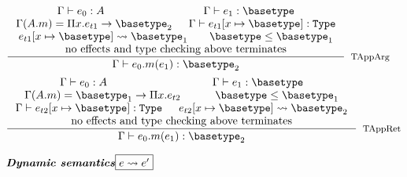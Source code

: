 \documentclass{article}
\def\emphbf#1{\textbf{\emph{#1}}}
\newcommand{\judgementHead}[2]{\ensuremath{\emphbf{#1}\hfill\fbox{#2}}}
\newcommand{\teval}[3]{\ensuremath{#1 \vdash #2:#3}}
\newcommand{\eeval}[2]{\ensuremath{#1 \rightsquigarrow #2}}
\newcommand{\subst}[2]{\ensuremath{[ #1 \mapsto #2 ]}}
\newcommand{\targ}{\texttt{targ}}
\newcommand{\trec}{\texttt{trec}}
\newcommand\trspace{\vspace{0.8em}}
\newcommand{\subtype}[2]{\ensuremath{#1\leq #2}}
\newcommand\expr{\ensuremath{e}\xspace}
\newcommand\type{\tau}
\newcommand\deptype{\ensuremath{\Pi\var.\expr}}
\newcommand\var{\ensuremath{x}\xspace}
\newcommand\eself{\texttt{self}\xspace}
\newcommand\emethcall[3]{\ensuremath{#1.#2(#3)}\xspace}
\newcommand\mthtype[2]{\ensuremath{#1 \rightarrow #2}\xspace}
\begin{document}
\begin{figure}
$$$$
\trspace
$$
\inference{\teval{\Gamma}{\expr_0}{A} &&
\teval{\Gamma}{\expr_1}{\basetype} \\
\Gamma(A.m) = \mthtype{\deptype_{t1}}{\basetype_2} &&
\teval{\Gamma}{\expr_{t1}\subst{\var}{\basetype}}{\texttt{Type}} \\
\eeval{\expr_{t1}\subst{\var}{\basetype}}{\basetype_1} &&
\subtype{\basetype}{\basetype_1} \\
\textnormal{no effects and type checking above terminates}
}
{\teval{\Gamma}{\emethcall{\expr_0}{m}{\expr_1}}{\basetype_2}}[TAppArg]
$$
\trspace
$$
\inference{\teval{\Gamma}{\expr_0}{A} &&
\teval{\Gamma}{\expr_1}{\basetype} \\
\Gamma(A.m) = \mthtype{\basetype_1}{\deptype_{t2}} &&
\subtype{\basetype}{\basetype_1} \\
\teval{\Gamma}{\expr_{t2}\subst{\var}{\basetype}}{\texttt{Type}} &&
\eeval{\expr_{t2}\subst{\var}{\basetype}}{\basetype_2} \\
\textnormal{no effects and type checking above terminates}
}
{\teval{\Gamma}{\emethcall{\expr_0}{m}{\expr_1}}{\basetype_2}}[TAppRet]
$$


\begin{comment}
\inference{\teval{\Gamma}{\expr_0}{\Gamma_1}{A} &&
\teval{\Gamma_1}{\expr_1}{\Gamma_2}{\basetype} \\
\Gamma_1(A.m) = \mthtype{\expr_{t1}}{\type_2} \\
\eeval{\expr_{t1}\subst{\trec}{A}\subst{\targ}{\basetype}\subst{\eself}{A}}{\basetype_1} \\
\teval{\Gamma_2\subst{A.m}{(\mthtype{\basetype_1}{\type_2})}}{\emethcall{\expr_0}{m}{\expr_1}}{\Gamma_3}{\basetype_2} \\
\textnormal{no effects in $e_{t1}$}
}
{\teval{\Gamma}{\emethcall{\expr_0}{m}{\expr_1}}{\Gamma_3}{\basetype_2}}[TAppArg]
$$
\trspace
$$
\inference{\teval{\Gamma}{\expr_0}{\Gamma_1}{A} &&
\teval{\Gamma_1}{\expr_1}{\Gamma_2}{\basetype} \\
\Gamma_1(A.m) = \mthtype{\basetype_1}{\expr_{t2}} \\
\basetype\leq\basetype_1 \\
\eeval{\expr_{t2}\subst{\trec}{A}\subst{\targ}{\basetype}\subst{\eself}{A}}{\basetype_2} \\
\textnormal{no effects in $e_{t2}$}
}
{\teval{\Gamma}{\emethcall{\expr_0}{m}{\expr_1}}{\Gamma_2}{\basetype_2}}[TAppRet]
\end{comment}
\end{figure}

\begin{figure}
\centering
\judgementHead{Dynamic semantics}{\eeval{\expr}{\expr'}}
\end{figure}
\end{document}
